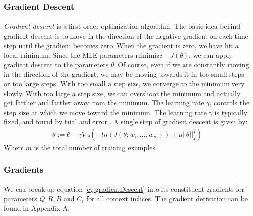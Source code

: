 \subsubsection{Gradient Descent}
\paragraph{}
\emph{Gradient descent} is a first-order optimization algorithm. The basic idea behind gradient descent is to move in the direction of the negative gradient on each time step until the gradient becomes zero. When the gradient is zero, we have hit a local minimum. Since the MLE parameters minimize $-J(\theta)$, we can apply gradient descent to the parameters $\theta$. Of course, even if we are constantly moving in the direction of the gradient, we may be moving towards it in too small steps or too large steps. With too small a step size, we converge to the minimum very slowly. With too large a step size, we can overshoot the minimum and actually get farther and farther away from the minimum. The learning rate $\gamma$, controls the step size at which we move toward the minimum. The learning rate $\gamma$ is typically fixed, and found by trial and error \cite{Elkan2013}.
A single step of gradient descent is given by:
\begin{align}
\theta := \theta - \gamma \nabla_\theta \left( -ln(J(\theta;w_i,\dots, w_m)) +  \mu ||\theta||^2_2 \right) \label{eg:gradientDescent} 
\end{align}
Where $m$ is the total number of training examples.

\subsubsection{Gradients}
\paragraph{}
We can break up equation \ref{eg:gradientDescent} into its constituent gradients for parameters $Q,R,B$ and $C_i$ for all context indices. The gradient derivation can be found in Appendix A.

